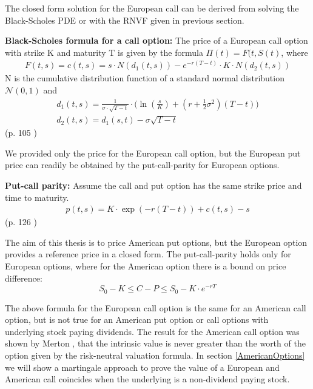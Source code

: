 The closed form solution for the European call can be derived from solving the Black-Scholes PDE or with the RNVF given in previous section. 
\theoremstyle{proposition}
\begin{proposition}{}\label{BS-price-EuroCall}
\textbf{Black-Scholes formula for a call option: } The price of a European call option with strike K and maturity T is given by the formula  $\Pi(t)=F(t,S(t)$, where
\begin{align*}
F(t,s)=c(t,s)=s \cdot N(d_1(t,s)) - e^{-r(T-t)}\cdot K \cdot N(d_2(t,s))
\end{align*}
N is the cumulative distribution function of a standard normal distribution $\mathcal{N}(0,1)$ and
\begin{align*}
d_1(t,s)=\frac{1}{\sigma\cdot \sqrt{T-t}} \cdot \bigg( \ln(\frac{s}{K}) + (r+\frac{1}{2} \sigma^2) (T-t) \bigg)\\
d_2(t,s)=d_1(s,t)-\sigma \sqrt{T-t}
\end{align*}
\null \hfill (p. 105 \parencite{finKont})
\end{proposition}
We provided only the price for the European call option, but the European put price can readily be obtained by the put-call-parity for European options.

\theoremstyle{proposition}
\begin{proposition}{}\label{put-call-parity}
\textbf{Put-call parity: } 
Assume the call and put option has the same strike price and time to maturity.
\begin{align*}
p(t,s)=K\cdot \exp(-r(T-t))+c(t,s)-s
\end{align*}
\null \hfill (p. 126 \parencite{finKont})
\end{proposition}

The aim of this thesis is to price American put options, but the European option provides a reference price in a closed form. The put-call-parity holds only for European options, where for the American option there is a bound on price difference:
$$S_0 - K \leq C-P \leq S_0 - K \cdot e^{-rT}$$

The above formula for the European call option is the same for an American call option, but is not true for an American put option or call options with underlying stock paying dividends. The result for the American call option was shown by Merton \parencite{Merton73}, that the intrinsic value is never greater than the worth of the option given by the risk-neutral valuation formula. In section \ref{AmericanOptions} we will show a martingale approach to prove the value of a European and American call coincides when the underlying is a non-dividend paying stock.

